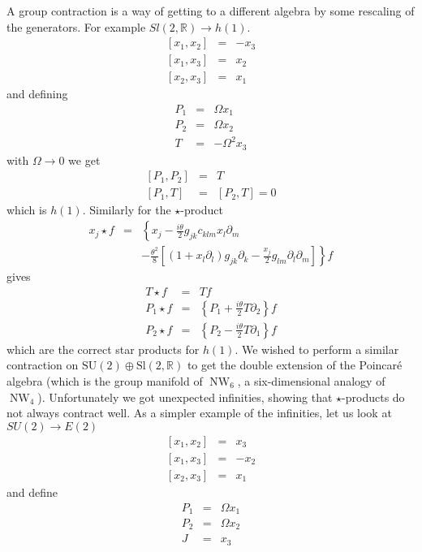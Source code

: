 \documentclass[14pt, a4paper, titlepage]{slides}
\DeclareMathOperator{\NW}{NW}
\newcommand{\cb}[2]{\left[ {#1} , {#2} \right]}
\begin{document}
A group contraction is a way of getting to a different algebra by some rescaling
of the generators. For example $Sl(2,\mathbb{R})\rightarrow h(1)$.
\begin{eqnarray*}
  \cb{x_1}{x_2} &=& -x_3\\
  \cb{x_1}{x_3} &=& x_2\\
  \cb{x_2}{x_3} &=& x_1
\end{eqnarray*}
and defining
\begin{eqnarray*}
  P_1&=&\Omega x_1\\
  P_2&=&\Omega x_2\\
  T&=&-\Omega^2x_3
\end{eqnarray*}
with $\Omega\rightarrow 0$ we get
\begin{eqnarray*}
  \cb{P_1}{P_2}&=&T\\
  \cb{P_1}{T}&=&\cb{P_2}{T}=0
\end{eqnarray*}
which is $h(1)$. Similarly for the $\star$-product
\begin{eqnarray*}
  x_j\star f&=&\left\{x_j-\frac{i\theta}{2}g_{jk}c_{klm}x_l\partial_m\right.\\
  &&-\frac{\theta^2}{8}\left[\left(1+x_l\partial_l\right)g_{jk}\partial_k -
    \frac{x_j}{2}g_{lm}\partial_l\partial_m\right]\left.\right\}f
\end{eqnarray*}
gives
\begin{eqnarray*}
  T\star f &=& Tf\\
  P_1\star f &=& \left\{P_1+\frac{i\theta}{2}T\partial_2\right\}f\\
  P_2\star f &=& \left\{P_2-\frac{i\theta}{2}T\partial_1\right\}f
\end{eqnarray*}
which are the correct star products for $h(1)$. We wished to perform a similar
contraction on $\mathrm{SU}(2)\oplus \mathrm{Sl}(2,\mathbb{R})$ to get the
double extension of the Poincar\'{e} algebra (which is the group manifold of
$\NW_6$, a six-dimensional analogy of $\NW_4$). Unfortunately we got unexpected
infinities, showing that $\star$-products do not always contract well. As a
simpler example of the infinities, let us look at $SU(2)\rightarrow E(2)$
\begin{eqnarray*}
  \cb{x_1}{x_2}&=&x_3\\
  \cb{x_1}{x_3}&=&-x_2\\
  \cb{x_2}{x_3}&=&x_1
\end{eqnarray*}
and define
\begin{eqnarray*}
  P_1&=&\Omega x_1\\
  P_2&=&\Omega x_2\\
  J&=&x_3
\end{eqnarray*}
\end{document}
